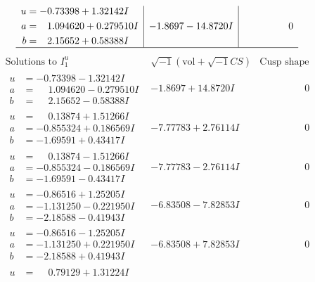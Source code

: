 \documentclass[1p]{elsarticle_modified}
\theoremstyle{definition}
\newcommand{\I}{\sqrt{-1}}
\begin{document}
$$\begin{array}{c|c|c}
\begin{aligned}
u &= -0.73398 + 1.32142 I \\
a &= \phantom{-}1.094620 + 0.279510 I \\
b &= \phantom{-}2.15652 + 0.58388 I\end{aligned}
 & -1.8697 - 14.8720 I & \phantom{-0.000000 } 0\\
 \hline 
 \end{array}$$\newpage$$\begin{array}{c|c|c}  
\text{Solutions to }I^u_{1}& \I (\text{vol} + \sqrt{-1}CS) & \text{Cusp shape}\\
 \hline 
\begin{aligned}
u &= -0.73398 - 1.32142 I \\
a &= \phantom{-}1.094620 - 0.279510 I \\
b &= \phantom{-}2.15652 - 0.58388 I\end{aligned}
 & -1.8697 + 14.8720 I & \phantom{-0.000000 } 0 \\ \hline\begin{aligned}
u &= \phantom{-}0.13874 + 1.51266 I \\
a &= -0.855324 + 0.186569 I \\
b &= -1.69591 + 0.43417 I\end{aligned}
 & -7.77783 + 2.76114 I & \phantom{-0.000000 } 0 \\ \hline\begin{aligned}
u &= \phantom{-}0.13874 - 1.51266 I \\
a &= -0.855324 - 0.186569 I \\
b &= -1.69591 - 0.43417 I\end{aligned}
 & -7.77783 - 2.76114 I & \phantom{-0.000000 } 0 \\ \hline\begin{aligned}
u &= -0.86516 + 1.25205 I \\
a &= -1.131250 - 0.221950 I \\
b &= -2.18588 - 0.41943 I\end{aligned}
 & -6.83508 - 7.82853 I & \phantom{-0.000000 } 0 \\ \hline\begin{aligned}
u &= -0.86516 - 1.25205 I \\
a &= -1.131250 + 0.221950 I \\
b &= -2.18588 + 0.41943 I\end{aligned}
 & -6.83508 + 7.82853 I & \phantom{-0.000000 } 0 \\ \hline\begin{aligned}
u &= \phantom{-}0.79129 + 1.31224 I \\

\end{aligned}
\end{array}$$
\end{document}
